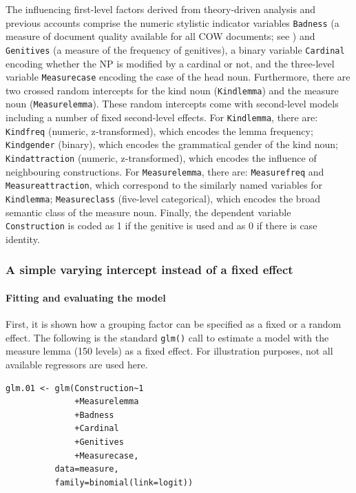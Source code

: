 The influencing first-level factors derived from theory-driven analysis and previous accounts comprise the numeric stylistic indicator variables \texttt{Badness} (a measure of document quality available for all COW documents; see \citealt{SchaeferEa2013}) and \texttt{Genitives} (a measure of the frequency of genitives), a binary variable \texttt{Cardinal} encoding whether the NP is modified by a cardinal or not, and the three-level variable \texttt{Measurecase} encoding the case of the head noun.
Furthermore, there are two crossed random intercepts for the kind noun (\texttt{Kindlemma}) and the measure noun (\texttt{Measurelemma}).
These random intercepts come with second-level models including a number of fixed second-level effects.
For \texttt{Kindlemma}, there are: \texttt{Kindfreq} (numeric, z-transformed), which encodes the lemma frequency; \texttt{Kindgender} (binary), which encodes the grammatical gender of the kind noun; \texttt{Kindattraction} (numeric, z-transformed), which encodes the influence of neighbouring constructions.
For \texttt{Measurelemma}, there are: \texttt{Measurefreq} and \texttt{Measureattraction}, which correspond to the similarly named variables for \texttt{Kindlemma}; \texttt{Measureclass} (five-level categorical), which encodes the broad semantic class of the measure noun.
Finally, the dependent variable \texttt{Construction} is coded as 1 if the genitive is used and as 0 if there is case identity.

\subsubsection{A simple varying intercept instead of a fixed effect}

\paragraph{Fitting and evaluating the model}

First, it is shown how a grouping factor can be specified as a fixed or a random effect.
The following is the standard \texttt{glm()} call to estimate a model with the measure lemma (150 levels) as a fixed effect.
For illustration purposes, not all available regressors are used here.

\vspace{0.5\baselineskip}

\begin{lstlisting}
glm.01 <- glm(Construction~1
              +Measurelemma
              +Badness
              +Cardinal
              +Genitives
              +Measurecase,
	      data=measure,
	      family=binomial(link=logit))
\end{lstlisting}

